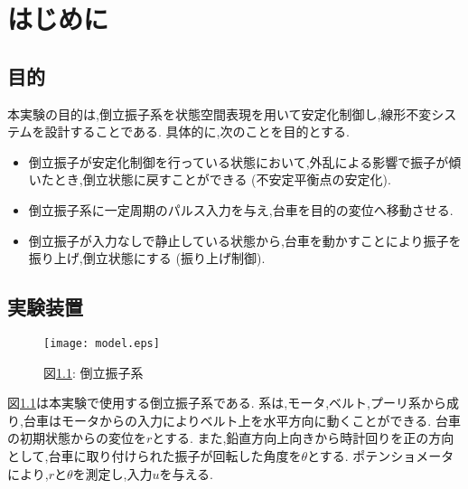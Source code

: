 \chapter{はじめに}
\section{目的}
本実験の目的は,倒立振子系を状態空間表現を用いて安定化制御し,線形不変システムを設計することである.
具体的に,次のことを目的とする.

\begin{itemize}
    \renewcommand{\labelenumi}{(\roman{enumi})}
    \item 倒立振子が安定化制御を行っている状態において,外乱による影響で振子が傾いたとき,倒立状態に戻すことができる (不安定平衡点の安定化).
    \item 倒立振子系に一定周期のパルス入力を与え,台車を目的の変位へ移動させる.
    \item 倒立振子が入力なしで静止している状態から,台車を動かすことにより振子を振り上げ,倒立状態にする (振り上げ制御).
\end{itemize}

\section{実験装置}

\begin{figure}[htbp]
    \begin{center}
        \texttt{[image: model.eps]}
        \caption{図\ref{pendulum}: 倒立振子系}
        \label{pendulum}
    \end{center}
\end{figure}

図\ref{pendulum}は本実験で使用する倒立振子系である.
系は,モータ,ベルト,プーリ系から成り,台車はモータからの入力によりベルト上を水平方向に動くことができる.
台車の初期状態からの変位を$r$とする.
また,鉛直方向上向きから時計回りを正の方向として,台車に取り付けられた振子が回転した角度を$\theta$とする.
ポテンショメータにより,$r$と$\theta$を測定し,入力$u$を与える.

